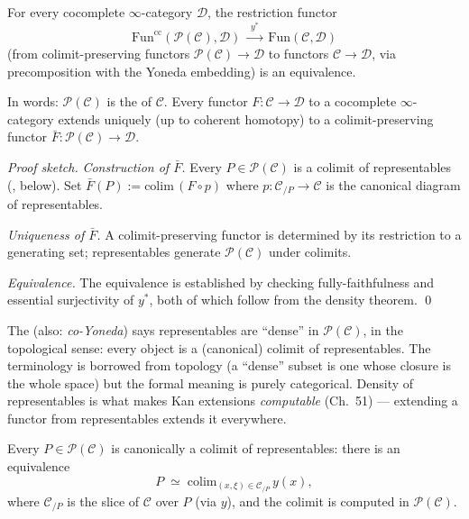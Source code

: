 \begin{theorem}
\label{thm:free-cocompletion}
For every cocomplete $\infty$-category $\mathcal{D}$, the restriction
functor
\begin{equation*}
  \mathrm{Fun}^{\mathrm{cc}}(\mathcal{P}(\mathcal{C}), \mathcal{D}) \;\xrightarrow{\;y^*\;}\; \mathrm{Fun}(\mathcal{C}, \mathcal{D})
\end{equation*}
(from colimit-preserving functors $\mathcal{P}(\mathcal{C}) \to \mathcal{D}$
to functors $\mathcal{C} \to \mathcal{D}$, via precomposition with the
Yoneda embedding) is an equivalence.

In words: $\mathcal{P}(\mathcal{C})$ is the  of
$\mathcal{C}$. Every functor $F : \mathcal{C} \to \mathcal{D}$ to a
cocomplete $\infty$-category extends uniquely (up to coherent homotopy)
to a colimit-preserving functor $\bar F : \mathcal{P}(\mathcal{C}) \to
\mathcal{D}$.
\end{theorem}

\begin{proof}[Proof sketch]
\emph{Construction of $\bar F$.} Every $P \in \mathcal{P}(\mathcal{C})$
is a colimit of representables (, below). Set
$\bar F(P) := \mathrm{colim}\,(F \circ p)$ where $p : \mathcal{C}_{/P} \to \mathcal{C}$
is the canonical diagram of representables.

\emph{Uniqueness of $\bar F$.} A colimit-preserving functor is determined
by its restriction to a generating set; representables generate
$\mathcal{P}(\mathcal{C})$ under colimits.

\emph{Equivalence.} The equivalence is established by checking
fully-faithfulness and essential surjectivity of $y^*$, both of which
follow from the density theorem.
\qed
\end{proof}

\begin{nameorigin}
The  (also: \emph{co-Yoneda}) says representables
are ``dense'' in $\mathcal{P}(\mathcal{C})$, in the topological sense:
every object is a (canonical) colimit of representables. The
terminology is borrowed from topology (a ``dense'' subset is one whose
closure is the whole space) but the formal meaning is purely
categorical. Density of representables is what makes Kan extensions
\emph{computable} (Ch.~51) — extending a functor from representables
extends it everywhere.
\end{nameorigin}

\begin{theorem}
\label{thm:density}
Every $P \in \mathcal{P}(\mathcal{C})$ is canonically a colimit of
representables: there is an equivalence
\begin{equation*}
  P \;\simeq\; \mathrm{colim}_{(x, \xi) \in \mathcal{C}_{/P}}\, y(x),
\end{equation*}
where $\mathcal{C}_{/P}$ is the slice of $\mathcal{C}$ over $P$
(via $y$), and the colimit is computed in $\mathcal{P}(\mathcal{C})$.
\end{theorem}

